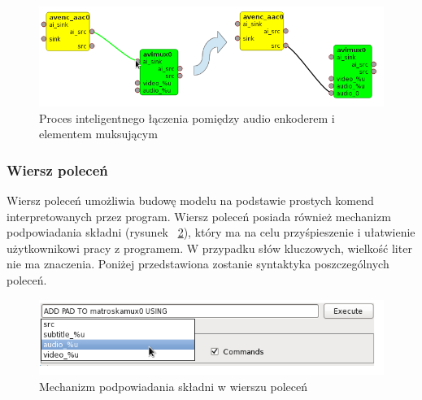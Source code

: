 \documentclass[12pt]{article}
\begin{document}
\begin{itemize}
\begin{figure}[H]
  \includegraphics[width=150mm]{img/ai-connection-process.png}
  \caption{Proces inteligentnego łączenia pomiędzy audio enkoderem i elementem muksującym}
  \label{fig:aiConnectionProcess}
\end{figure}
\end{itemize}
\subsubsection{Wiersz poleceń}
Wiersz poleceń umożliwia budowę modelu na podstawie prostych komend interpretowanych przez program. Wiersz poleceń posiada również mechanizm podpowiadania składni (rysunek ~\ref{fig:commandLine}), który ma na celu przyśpieszenie i ułatwienie użytkownikowi pracy z programem. W przypadku słów kluczowych, wielkość liter nie ma znaczenia. Poniżej przedstawiona zostanie syntaktyka poszczególnych poleceń. 
\begin{figure}[H]
  \includegraphics[width=140mm]{img/command-line.png}
  \caption{Mechanizm podpowiadania składni w wierszu poleceń}
  \label{fig:commandLine}
\end{figure}
\end{document}
